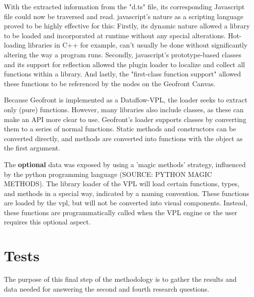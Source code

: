 With the extracted information from the "d.ts" file, its corresponding Javascript file could now be traversed and read.
javascript's nature as a scripting language proved to be highly effective for this:
Firstly, its dynamic nature allowed a library to be loaded and incorporated at runtime without any special alterations. 
Hot-loading libraries in C++ for example, can't usually be done without significantly altering the way a program runs. 
Secondly, javascript's prototype-based classes and its support for reflection allowed the plugin loader to localize and collect all functions within a library.
And lastly, the "first-class function support" allowed these functions to be referenced by the nodes on the Geofront Canvas. 

Because Geofront is implemented as a Dataflow-VPL, the loader seeks to extract only (pure) functions. 
However, many libraries also include classes, as these can make an API more clear to use. 
Geofront's loader supports classes by converting them to a series of normal functions. 
Static methods and constructors can be converted directly, and methods are converted into functions with the object as the first argument.

The \textbf{optional} data was exposed by using a 'magic methods' strategy, influenced by the python programming language (SOURCE: PYTHON MAGIC METHODS). 
The library loader of the VPL will load certain functions, types, and methods in a special way, indicated by a naming convention. 
These functions are loaded by the vpl, but will not be converted into visual components. 
Instead, these functions are programmatically called when the VPL engine or the user requires this optional aspect. 




\section{Tests}
The purpose of this final step of the methodology is to gather the results and data needed for answering the second and fourth research questions. 

